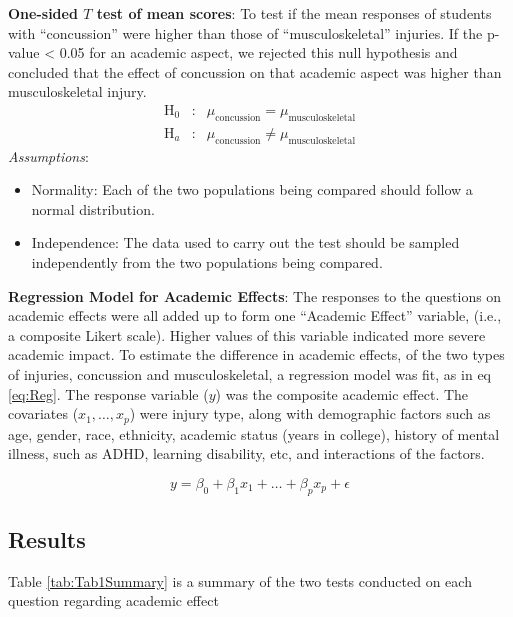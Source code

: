 \documentclass[12]{article}
\begin{document}
\noindent
{\bf{One-sided $T$ test of mean scores}}: To test if the mean responses of students with ``concussion'' were higher than those of ``musculoskeletal'' injuries. If the p-value < 0.05 for an academic aspect, we rejected this null hypothesis and concluded that the effect of concussion on that academic aspect was higher than musculoskeletal injury.
\begin{eqnarray}
\nonumber
\text{H}_0&:& \mu_{\text{concussion}} = \mu_{\text{musculoskeletal}} \\
\text{H}_a&:& \mu_{\text{concussion}} \ne \mu_{\text{musculoskeletal}}
\label{eq:tTest}
\end{eqnarray}
{\emph{Assumptions}}:
\begin{itemize}
\item Normality: Each of the two populations being compared should follow a normal distribution. 
\item Independence: The data used to carry out the test should be sampled independently from the two populations being compared. 
\end{itemize}

\noindent
{\bf{Regression Model for Academic Effects}}: The responses to the questions on academic effects were all added up to form one ``Academic Effect'' variable, (i.e., a composite Likert scale). Higher values of this variable indicated more severe academic impact. To estimate the difference in academic effects, of the two types of injuries, concussion and musculoskeletal, a regression model was fit, as in eq \ref{eq:Reg}. The response variable ($y$) was the composite academic effect. The covariates ($x_1, \dots, x_p$) were injury type, along with demographic factors such as age, gender, race, ethnicity, academic status (years in college), history of mental illness, such as ADHD, learning disability, etc, and interactions of the factors.

\begin{equation} 
y = \beta_0 + \beta_1x_1 + \dots + \beta_p x_p + \epsilon 
\label{eq:Reg}
\end{equation}

\subsection*{Results}
Table \ref{tab:Tab1Summary} is a summary of the two tests conducted on each question regarding academic effect
\end{document}
